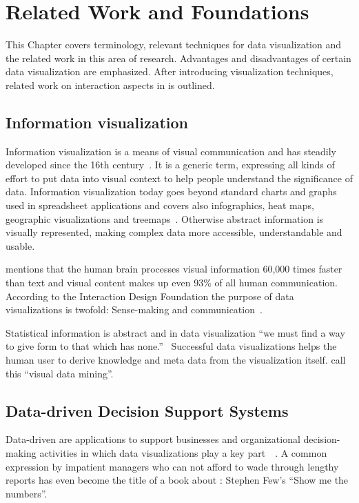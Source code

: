 \chapter{Related Work and Foundations}\label{sec:related-work}

This Chapter covers terminology, relevant techniques for data visualization and the related work in this area of research.
Advantages and disadvantages of certain data visualization are emphasized.
After introducing visualization techniques, related work on interaction aspects in \cmvs{} is outlined.


\section{Information visualization}
Information visualization is a means of visual communication and has steadily developed since the 16th century~\parencite{Friendly2001}.
It is a generic term, expressing all kinds of effort to put data into visual context to help people understand the significance of data.
Information visualization today goes beyond standard charts and graphs used in spreadsheet applications and covers also infographics, heat maps, geographic visualizations and treemaps~\parencite{Rouse2017}.
Otherwise abstract information is visually represented, making complex data more accessible, understandable and usable.

\textcite{Kusinitz2014} mentions that the human brain processes visual information 60,000 times faster than text and visual content makes up even 93\% of all human communication.
According to the Interaction Design Foundation the purpose of data visualizations is twofold:
Sense-making and communication~\parencite{Few2013}.

Statistical information is abstract and in data visualization ``we must find a way to give form to that which has none.''~\parencite{Few2013}
Successful data visualizations helps the human user to derive knowledge and meta data from the visualization itself.
\textcite{Nocke2002} call this ``visual data mining''.

\section{Data-driven Decision Support Systems}
Data-driven \dss{} are applications to support businesses and organizational decision-making activities in which data visualizations play a key part~\parencite{Nada2007}~\parencite{Poleto2015}.
A common expression by impatient managers who can not afford to wade through lengthy reports has even become the title of a book about \dss{}:
Stephen Few's ``Show me the numbers''.

